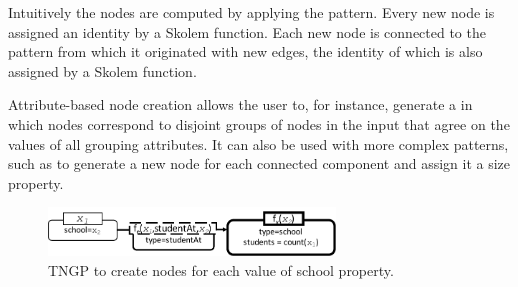 Intuitively the nodes are computed
by applying the pattern.  Every new node is assigned an identity by a
Skolem function.  Each new node is connected to the pattern from which
it originated with new edges, the identity of which is also assigned
by a Skolem function.

Attribute-based node creation allows the user to, for instance,
generate a \tg in which nodes correspond to disjoint groups of nodes
in the input that agree on the values of all grouping attributes.  It
can also be used with more complex patterns, such as to generate a new
node for each connected component and assign it a size property.

\begin{figure}
\centering
\includegraphics[width=3in]{figs/schoolncr.pdf}
\caption{TNGP to create nodes for each value of school property.}
\vspace{-0.2cm}
\label{fig:schoolncr}
\vspace{-0.2cm}
\end{figure}

